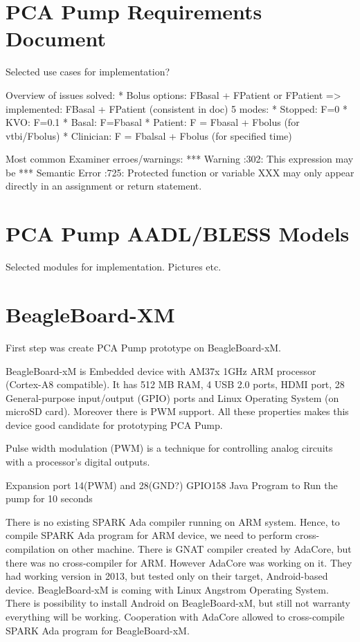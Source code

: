 \section{PCA Pump Requirements Document}
\label{pcapump:requirements-doc}

Selected use cases for implementation?


Overview of issues solved: 
* Bolus options: FBasal + FPatient or FPatient => implemented: FBasal + FPatient (consistent in doc)
5 modes:
* Stopped: F=0
* KVO: F=0.1
* Basal: F=Fbasal
* Patient: F = Fbasal + Fbolus (for vtbi/Fbolus)
* Clinician: F = Fbalsal + Fbolus (for specified time)

Most common Examiner\cite{Examiner:Online} erroes/warnings:
***        Warning                     :302: This expression may be
***        Semantic Error              :725: Protected function or variable XXX may only appear directly in an assignment or return statement.


\section{PCA Pump AADL/BLESS Models}
\label{pcapump:aadl-bless-models}
Selected modules for implementation. Pictures etc.


\section{BeagleBoard-XM}
\label{pcapump:beagleboard}
First step was create PCA Pump prototype on BeagleBoard-xM.

BeagleBoard-xM is Embedded device with AM37x 1GHz ARM processor (Cortex-A8 compatible). It has 512 MB RAM, 4 USB 2.0 ports, HDMI port, 28 General-purpose input/output (GPIO) ports and Linux Operating System (on microSD card). Moreover there is PWM support. All these properties makes this device good candidate for prototyping PCA Pump.

Pulse width modulation (PWM) is a technique for controlling analog circuits with a processor's digital outputs.

Expansion port 14(PWM) and 28(GND?)
GPIO158
Java Program to Run the pump for 10 seconds

There is no existing SPARK Ada compiler running on ARM system. Hence, to compile SPARK Ada program for ARM device, we need to perform cross-compilation on other machine. There is GNAT compiler \cite{Horn:Thesis} created by AdaCore, but there was no cross-compiler for ARM. However AdaCore was working on it. They had working version in 2013, but tested only on their target, Android-based device. BeagleBoard-xM is coming with Linux Angstrom Operating System. There is possibility to install Android on BeagleBoard-xM, but still not warranty everything will be working. Cooperation with AdaCore allowed to cross-compile SPARK Ada program for BeagleBoard-xM.

